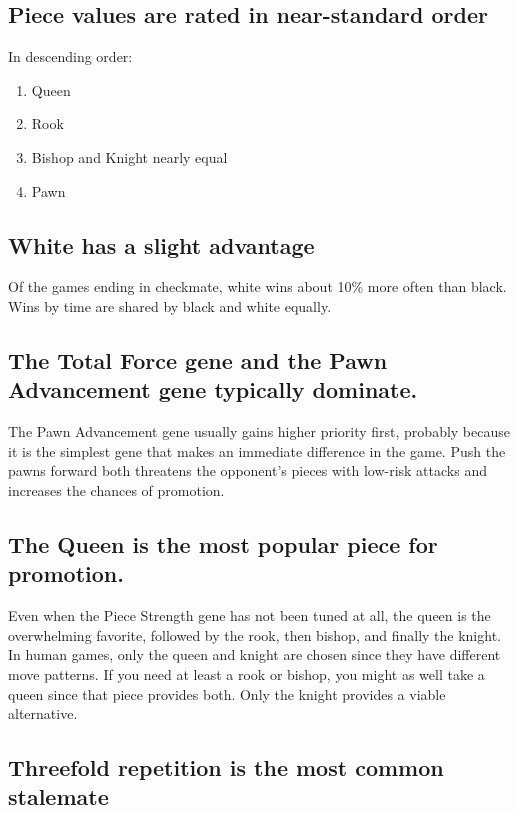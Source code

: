 \documentclass[letter]{article}
\renewcommand\_{\textunderscore\allowbreak}
\begin{document}
\subsection*{Piece values are rated in near-standard order}
In descending order:
\begin{enumerate}
	\item Queen
	\item Rook
	\item Bishop and Knight nearly equal
	\item Pawn
\end{enumerate}

\subsection*{White has a slight advantage}

Of the games ending in checkmate, white wins about 10\% more often than black. Wins by time are shared by black and white equally.

\subsection*{The Total Force gene and the Pawn Advancement gene typically dominate.}

The Pawn Advancement gene usually gains higher priority first, probably because it is the simplest gene that makes an immediate difference in the game. Push the pawns forward both threatens the opponent's pieces with low-risk attacks and increases the chances of promotion.

\subsection*{The Queen is the most popular piece for promotion.}

Even when the Piece Strength gene has not been tuned at all, the queen is the overwhelming favorite, followed by the rook, then bishop, and finally the knight. In human games, only the queen and knight are chosen since they have different move patterns. If you need at least a rook or bishop, you might as well take a queen since that piece provides both. Only the knight provides a viable alternative. 


\subsection*{Threefold repetition is the most common stalemate}
\end{document}

